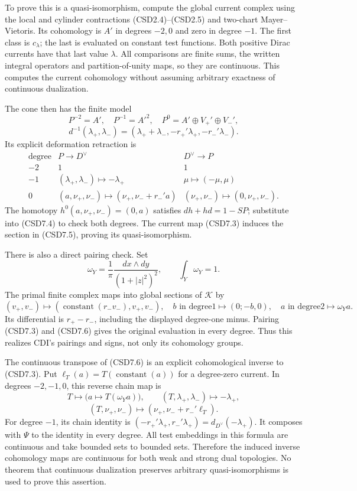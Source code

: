 To prove this is a quasi-isomorphism, compute the global current complex
using the local and cylinder contractions (CSD2.4)--(CSD2.5) and
two-chart Mayer--Vietoris. Its cohomology is \(A'\) in degrees \(-2,0\)
and zero in degree \(-1\). The first class is \(c_\lambda\); the last is
evaluated on constant test functions. Both positive Dirac currents have
that last value \(\lambda\). All comparisons are finite sums, the
written integral operators and partition-of-unity maps, so they are
continuous. This computes the current cohomology without assuming
arbitrary exactness of continuous dualization.

The cone then has the finite model \[
P^{-2}=A',\quad P^{-1}=A'^2,\quad
P^0=A'\oplus V_+'\oplus V_-',
\] \[
d^{-1}(\lambda_+,\lambda_-)
=(\lambda_++\lambda_-,-r_+'\lambda_+,-r_-'\lambda_-).
\tag{CSD7.4}
\] Its explicit deformation retraction is \[
\begin{array}{c|c|c}
\text{degree}&P\to D^\vee&D^\vee\to P\\ \hline
-2&1&1\\
-1&(\lambda_+,\lambda_-)\mapsto-\lambda_+&
\mu\mapsto(-\mu,\mu)\\
0&(a,\nu_+,\nu_-)\mapsto(\nu_+,\nu_-+r_-'a)&
(\nu_+,\nu_-)\mapsto(0,\nu_+,\nu_-).
\end{array}
\tag{CSD7.5}
\] The homotopy \(h^0(a,\nu_+,\nu_-)=(0,a)\) satisfies \(dh+hd=1-SP\);
substitute into (CSD7.4) to check both degrees. The current map (CSD7.3)
induces the section in (CSD7.5), proving its quasi-isomorphism.

There is also a direct pairing check. Set \[
\omega_Y=\frac1\pi\frac{dx\wedge dy}{(1+|z|^2)^2},\qquad \int_Y\omega_Y=1.
\] The primal finite complex maps into global sections of \(\mathscr K\)
by \[
(v_+,v_-)\mapsto
(\operatorname{constant}(r_-v_-),v_+,v_-),\quad
b\text{ in degree1}\mapsto(0;-b,0),\quad
a\text{ in degree2}\mapsto\omega_Ya.
\tag{CSD7.6}
\] Its differential is \(r_+-r_-\), including the displayed degree-one
minus. Pairing (CSD7.3) and (CSD7.6) gives the original evaluation in
every degree. Thus this realizes CDI's pairings and signs, not only its
cohomology groups.

The continuous transpose of (CSD7.6) is an explicit cohomological
inverse to (CSD7.3). Put \(\ell_T(a)=T(\operatorname{constant}(a))\) for
a degree-zero current. In degrees \(-2,-1,0\), this reverse chain map is
\[
T\mapsto\bigl(a\mapsto T(\omega_Ya)\bigr),\qquad
(T,\lambda_+,\lambda_-)\mapsto-\lambda_+,
\] \[
(T,\nu_+,\nu_-)\mapsto(\nu_+,\nu_-+r_-'\ell_T).
\tag{CSD7.8}
\] For degree \(-1\), its chain identity is
\((-r_+'\lambda_+,r_-'\lambda_+)=d_{D^\vee}(-\lambda_+)\). It composes
with \(\Psi\) to the identity in every degree. All test embeddings in
this formula are continuous and take bounded sets to bounded sets.
Therefore the induced inverse cohomology maps are continuous for both
weak and strong dual topologies. No theorem that continuous dualization
preserves arbitrary quasi-isomorphisms is used to prove this assertion.

